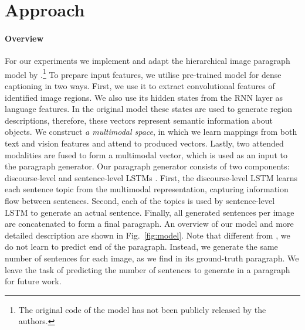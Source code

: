 \documentclass[11pt,a4paper]{article}
\newcommand{\kibitz}[2]{\ifnum\Comments=1\textcolor{#1}{#2}\fi}
\newcommand{\nikolai}[1]{\kibitz{red}      {[Nikolai: #1]}}
\begin{document}
\section{Approach}
\paragraph{Overview}
For our experiments we implement and adapt the hierarchical image paragraph model by \cite{krause2016hierarchical}.\footnote{The original code of the model has not been publicly released by the authors.}
To prepare input features, we utilise pre-trained model for dense captioning \cite{densecap} in two ways.
First, we use it to extract convolutional features of identified image regions.
We also use its hidden states from the RNN layer as language features.
In the original model these states are used to generate region descriptions, therefore, these vectors represent semantic information about objects.
We construct \textit{a multimodal space}, in which we learn mappings from both text and vision features and attend to produced vectors.
Lastly, two attended modalities are fused to form a multimodal vector, which is used as an input to the paragraph generator.
Our paragraph generator consists of two components: discourse-level and sentence-level LSTMs \cite{lstm97}.
First, the discourse-level LSTM learns each sentence topic from the multimodal representation, capturing information flow between sentences.
Second, each of the topics is used by sentence-level LSTM to generate an actual sentence.
Finally, all generated sentences per image are concatenated to form a final paragraph.
An overview of our model and more detailed description are shown in Fig.~\ref{fig:model}.
Note that different from , we do not learn to predict end of the paragraph.
Instead, we generate the same number of sentences for each image, as we find in its ground-truth paragraph.
We leave the task of predicting the number of sentences to generate in a paragraph for future work.

\end{document}
